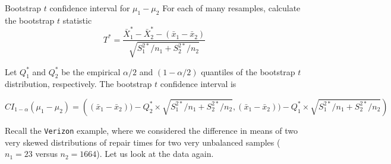 \documentclass[
  ignorenonframetext,
]{beamer}
\begin{document}
\begin{frame}[fragile]{Bootstrap \(t\) confidence interval for
\(\mu_1-\mu_2\)}
\label{bootstrap-t-confidence-interval-for-mu_1-mu_2}
For each of many resamples, calculate the bootstrap \(t\) statistic
\[T^*=\frac{\bar{X}^*_1-\bar{X}^*_2-(\bar{x}_1-\bar{x}_2)}{\sqrt{S^{2*}_1/n_1+S^{2*}_2/n_2}}\]

Let \(Q_1^*\) and \(Q_2^*\) be the empirical \(\alpha/2\) and
\((1-\alpha/2)\) quantiles of the bootstrap \(t\) distribution,
respectively. The bootstrap \(t\) confidence interval is

\[\scriptstyle CI_{1-\alpha}(\mu_1-\mu_2)=\left((\bar{x}_1-\bar{x}_2))-Q_2^*\times\sqrt{S^{2*}_1/n_1+S^{2*}_2/n_2},(\bar{x}_1-\bar{x}_2))-Q_1^*\times\sqrt{S^{2*}_1/n_1+S^{2*}_2/n_2}\right)\]

Recall the \texttt{Verizon} example, where we considered the difference
in means of two very skewed distributions of repair times for two very
unbalanced samples (\(n_1=23\) versus \(n_2=1664\)). Let us look at the
data again.
\end{frame}
\end{document}
